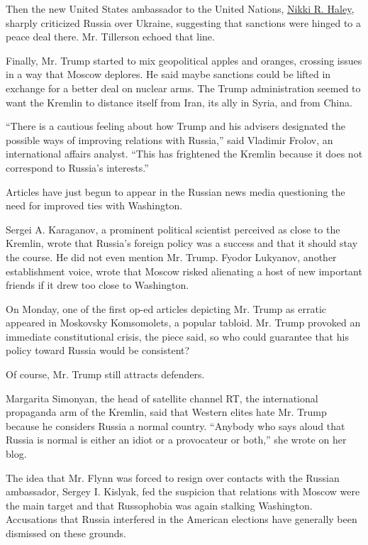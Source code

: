 Then the new United States ambassador to the United Nations,
\href{https://www.nytimes.com/2017/01/27/world/americas/nikki-haley-united-nations.html}{Nikki
R. Haley}, sharply criticized Russia over Ukraine, suggesting that
sanctions were hinged to a peace deal there. Mr. Tillerson echoed that
line.

Finally, Mr. Trump started to mix geopolitical apples and oranges,
crossing issues in a way that Moscow deplores. He said maybe sanctions
could be lifted in exchange for a better deal on nuclear arms. The Trump
administration seemed to want the Kremlin to distance itself from Iran,
its ally in Syria, and from China.

``There is a cautious feeling about how Trump and his advisers
designated the possible ways of improving relations with Russia,'' said
Vladimir Frolov, an international affairs analyst. ``This has frightened
the Kremlin because it does not correspond to Russia's interests.''

Articles have just begun to appear in the Russian news media questioning
the need for improved ties with Washington.

Sergei A. Karaganov, a prominent political scientist perceived as close
to the Kremlin, wrote that Russia's foreign policy was a success and
that it should stay the course. He did not even mention Mr. Trump.
Fyodor Lukyanov, another establishment voice, wrote that Moscow risked
alienating a host of new important friends if it drew too close to
Washington.

On Monday, one of the first op-ed articles depicting Mr. Trump as
erratic appeared in Moskovsky Komsomolets, a popular tabloid. Mr. Trump
provoked an immediate constitutional crisis, the piece said, so who
could guarantee that his policy toward Russia would be consistent?

Of course, Mr. Trump still attracts defenders.

Margarita Simonyan, the head of satellite channel RT, the international
propaganda arm of the Kremlin, said that Western elites hate Mr. Trump
because he considers Russia a normal country. ``Anybody who says aloud
that Russia is normal is either an idiot or a provocateur or both,'' she
wrote on her blog.

The idea that Mr. Flynn was forced to resign over contacts with the
Russian ambassador, Sergey I. Kislyak, fed the suspicion that relations
with Moscow were the main target and that Russophobia was again stalking
Washington. Accusations that Russia interfered in the American elections
have generally been dismissed on these grounds.

